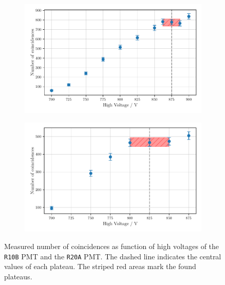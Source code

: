 \begin{figure}
        \centering
        \begin{subfigure}[b]{0.48\textwidth}
        \includegraphics[width=\textwidth]{plots/hvR20A.pdf}
        \label{fig:hvPMT1}
    \end{subfigure}\hfill
\begin{subfigure}[b]{0.48\textwidth}
        \includegraphics[width=\textwidth]{plots/hvR10B.pdf}
        \label{fig:hvPMT2}
\end{subfigure}
\caption{Measured number of coincidences as function of high voltages
of the \texttt{R10B} PMT and the \texttt{R20A} PMT.
The dashed line indicates the central values of each plateau. The striped red areas mark the found plateaus.}
\label{fig:hv}
\end{figure}


